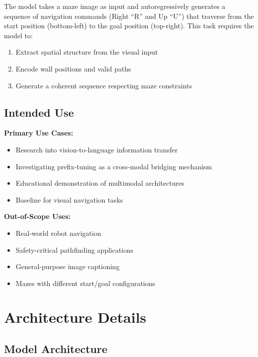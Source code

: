 \documentclass[11pt,a4paper]{article}
\begin{document}
The model takes a maze image as input and autoregressively generates a sequence of navigation commands (Right ``R'' and Up ``U'') that traverse from the start position (bottom-left) to the goal position (top-right). This task requires the model to:
\begin{enumerate}[noitemsep]
    \item Extract spatial structure from the visual input
    \item Encode wall positions and valid paths
    \item Generate a coherent sequence respecting maze constraints
\end{enumerate}

\subsection{Intended Use}

\textbf{Primary Use Cases:}
\begin{itemize}[noitemsep]
    \item Research into vision-to-language information transfer
    \item Investigating prefix-tuning as a cross-modal bridging mechanism
    \item Educational demonstration of multimodal architectures
    \item Baseline for visual navigation tasks
\end{itemize}

\textbf{Out-of-Scope Uses:}
\begin{itemize}[noitemsep]
    \item Real-world robot navigation
    \item Safety-critical pathfinding applications
    \item General-purpose image captioning
    \item Mazes with different start/goal configurations
\end{itemize}

\section{Architecture Details}

\subsection{Model Architecture}
\end{document}
